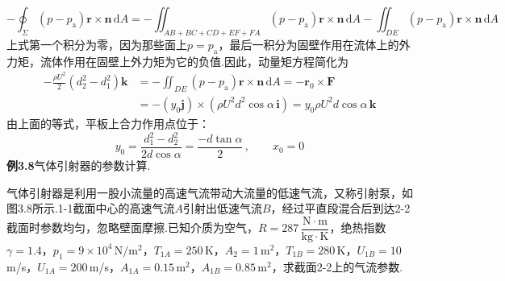 \[
-\oint_\Sigma(p-p_{\mathrm{a}})\boldsymbol{r}\times\boldsymbol{n}\,\mathrm{d}A=-\iint_{AB+BC+CD+EF+FA}(p-p_{\mathrm{a}})\boldsymbol{r}\times\boldsymbol{n}\,\mathrm{d}A-\iint_{DE}(p-p_{\mathrm{a}})\boldsymbol{r}\times\boldsymbol{n}\,\mathrm{d}A
\]
上式第一个积分为零，因为那些面上$p=p_{\mathrm{a}}$，最后一积分为固壁作用在流体上的外力矩，流体作用在固壁上外力矩为它的负值.因此，动量矩方程简化为
\begin{align*}
-\frac{\rho U^{2}}{2}(d_2^{2}-d_1^{2})\boldsymbol{k}&=-\iint_{DE}(p-p_{\mathrm{a}})\boldsymbol{r}\times\boldsymbol{n}\,\mathrm{d}A=-\boldsymbol{r}_0\times\boldsymbol{F}\\
&=-(y_0\boldsymbol{j})\times(\rho U^{2}d^{2}\cos\alpha\,\boldsymbol{i})=y_0\rho U^{2}d\cos\alpha\,\boldsymbol{k}
\end{align*}
由上面的等式，平板上合力作用点位于：
\[
y_0=\frac{d_1^{2}-d_2^{2}}{2d\cos\alpha}=\frac{-d\tan\alpha}{2}\,,\qquad x_0=0
\]
\noindent\textbf{例3.8}\quad 气体引射器的参数计算.

气体引射器是利用一股小流量的高速气流带动大流量的低速气流，又称引射泵，如图3.8所示.1-1截面中心的高速气流$A$引射出低速气流$B$，经过平直段混合后到达2-2截面时参数均匀，忽略壁面摩擦.已知介质为空气，$R=287\,\dfrac{\mathrm{N\cdot m}}{\mathrm{kg\cdot K}}$，绝热指数$\gamma=1.4$，$p_1=9\times 10^{4}\,\mathrm{N/m^2}$，$T_{1A}=250\,$K，$A_2=1\,\mathrm{m^2}$，$T_{1B}=280\,$K，$U_{1B}=10\,$m/s，$U_{1A}=200\,$m/s，$A_{1A}=0.15\,\mathrm{m^2}$，$A_{1B}=0.85\,\mathrm{m^2}$，求截面2-2上的气流参数.

